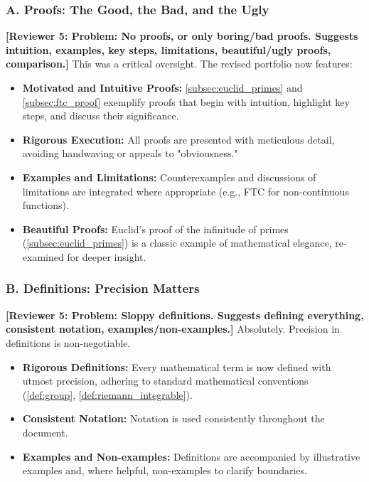 \documentclass[11pt, a4paper]{article}
\theoremstyle{plain} %
\theoremstyle{definition} %
\theoremstyle{remark} %
\newcommand{\reviewer}[1]{\textcolor{reviewercolor}{\textbf{[Reviewer 5: #1]}}}
\begin{document}
\subsubsection*{A. Proofs: The Good, the Bad, and the Ugly}
\reviewer{Problem: No proofs, or only boring/bad proofs. Suggests intuition, examples, key steps, limitations, beautiful/ugly proofs, comparison.}
This was a critical oversight. The revised portfolio now features:
\begin{itemize}
    \item \textbf{Motivated and Intuitive Proofs:} \ref{subsec:euclid_primes} and \ref{subsec:ftc_proof} exemplify proofs that begin with intuition, highlight key steps, and discuss their significance.
    \item \textbf{Rigorous Execution:} All proofs are presented with meticulous detail, avoiding handwaving or appeals to "obviousness."
    \item \textbf{Examples and Limitations:} Counterexamples and discussions of limitations are integrated where appropriate (e.g., FTC for non-continuous functions).
    \item \textbf{Beautiful Proofs:} Euclid's proof of the infinitude of primes (\ref{subsec:euclid_primes}) is a classic example of mathematical elegance, re-examined for deeper insight.

\end{itemize}
\subsubsection*{B. Definitions: Precision Matters}
\reviewer{Problem: Sloppy definitions. Suggests defining everything, consistent notation, examples/non-examples.}
Absolutely. Precision in definitions is non-negotiable.
\begin{itemize}
    \item \textbf{Rigorous Definitions:} Every mathematical term is now defined with utmost precision, adhering to standard mathematical conventions (\ref{def:group}, \ref{def:riemann_integrable}).
    \item \textbf{Consistent Notation:} Notation is used consistently throughout the document.
    \item \textbf{Examples and Non-examples:} Definitions are accompanied by illustrative examples and, where helpful, non-examples to clarify boundaries.

\end{itemize}
\end{document}
